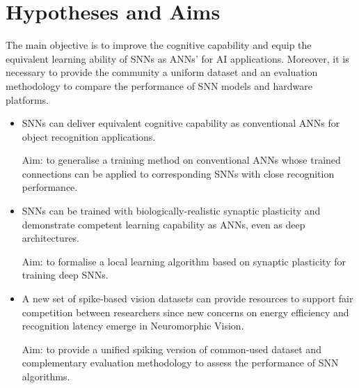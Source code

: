 \section{Hypotheses and Aims}
\label{sec:aim}
The main objective is to improve the cognitive capability and equip the equivalent learning ability of SNNs as ANNs' for AI applications.
Moreover, it is necessary to provide the community a uniform dataset and an evaluation methodology to compare the performance of SNN models and hardware platforms.

\begin{itemize}
%

	\item 
	SNNs can deliver equivalent cognitive capability as conventional ANNs for object recognition applications.

	Aim: to generalise a training method on conventional ANNs whose trained connections can be applied to corresponding SNNs with close recognition performance.

	\item 
	SNNs can be trained with biologically-realistic synaptic plasticity and demonstrate competent learning capability as ANNs, even as deep architectures.

	Aim: to formalise a local learning algorithm based on synaptic plasticity for training deep SNNs.

	\item 
	A new set of spike-based vision datasets can provide resources to support fair competition between researchers since new concerns on energy efficiency and recognition latency emerge in Neuromorphic Vision.

	Aim: to provide a unified spiking version of common-used dataset and complementary evaluation methodology to assess the performance of SNN algorithms.
\end{itemize}


